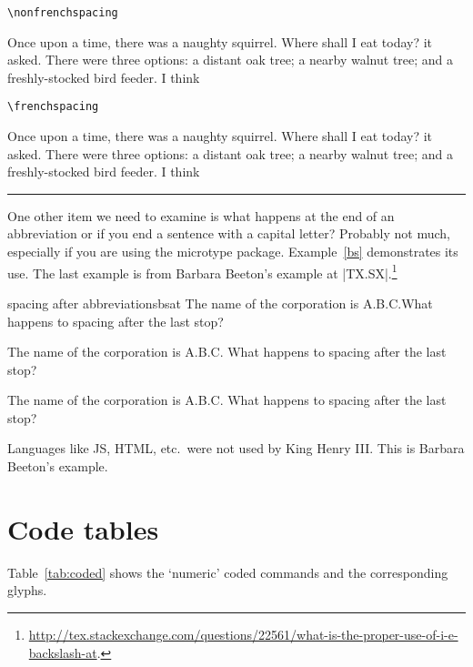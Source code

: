 \bigskip

\smallskip
{\hfill\hfill\small \texttt{\textbackslash nonfrenchspacing}}

\medskip
\raggedright
     \nonfrenchspacing Once upon a time, there was a naughty squirrel. Where shall I eat
     today? it asked. There were three options: a distant oak tree; a nearby 
    walnut tree; and a freshly-stocked bird feeder. I think\par \par

\bigskip

\smallskip
{\hfill\hfill\noindent\small \texttt{\textbackslash frenchspacing}}

\medskip
     \frenchspacing Once upon a time, there was a naughty squirrel. Where shall I eat
     today? it asked. There were three options: a distant oak tree; a nearby 
    walnut tree; and a freshly-stocked bird feeder. I think\par \par

\medskip
\noindent\rule{\linewidth}{0.4pt}
\endgroup


One other item we need to examine is what happens at the end of an abbreviation or if you end a sentence with a capital letter? Probably not much, especially if you are using the microtype package. Example~\ref{bs} demonstrates its use. The last example is from Barbara Beeton's example at |TX.SX|.\footnote{\url{http://tex.stackexchange.com/questions/22561/what-is-the-proper-use-of-i-e-backslash-at}.}

\begin{texexample}{spacing after abbreviations}{bsat}
\makeatother
The name of the corporation is A.B.C.What happens to spacing after the last stop? 

The name of the corporation is A.B.C. What happens to spacing after the last stop?

The name of the corporation is A.B.C\@. What happens to spacing after the last stop?

Languages like JS, HTML, etc.\ were not used by King Henry III\@. This is Barbara Beeton's example.
\end{texexample}

\section{Code tables}

Table~\ref{tab:coded} 
shows the `numeric' coded commands and the corresponding
glyphs. 

